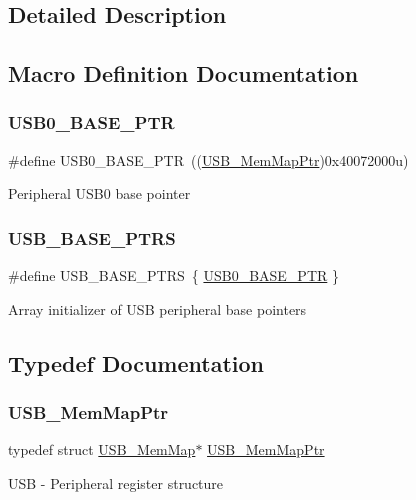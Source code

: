 \subsection{Detailed Description}


\subsection{Macro Definition Documentation}
\mbox{\label{group___u_s_b___peripheral_ga598ff5eb20a0551af232710b3f27640a}} 
\subsubsection{\texorpdfstring{U\+S\+B0\+\_\+\+B\+A\+S\+E\+\_\+\+P\+TR}{USB0\_BASE\_PTR}}
{\footnotesize\ttfamily \#define U\+S\+B0\+\_\+\+B\+A\+S\+E\+\_\+\+P\+TR~((\hyperlink{group___u_s_b___peripheral_gaabd989a49827dc34abb5de32732f4125}{U\+S\+B\+\_\+\+Mem\+Map\+Ptr})0x40072000u)}

Peripheral U\+S\+B0 base pointer \mbox{\label{group___u_s_b___peripheral_gabb481a231c7c57907377d7ee985f826c}} 
\subsubsection{\texorpdfstring{U\+S\+B\+\_\+\+B\+A\+S\+E\+\_\+\+P\+T\+RS}{USB\_BASE\_PTRS}}
{\footnotesize\ttfamily \#define U\+S\+B\+\_\+\+B\+A\+S\+E\+\_\+\+P\+T\+RS~\{ \hyperlink{group___u_s_b___peripheral_ga598ff5eb20a0551af232710b3f27640a}{U\+S\+B0\+\_\+\+B\+A\+S\+E\+\_\+\+P\+TR} \}}

Array initializer of U\+SB peripheral base pointers 

\subsection{Typedef Documentation}
\mbox{\label{group___u_s_b___peripheral_gaabd989a49827dc34abb5de32732f4125}} 
\subsubsection{\texorpdfstring{U\+S\+B\+\_\+\+Mem\+Map\+Ptr}{USB\_MemMapPtr}}
{\footnotesize\ttfamily typedef struct \hyperlink{struct_u_s_b___mem_map}{U\+S\+B\+\_\+\+Mem\+Map}$\ast$ \hyperlink{group___u_s_b___peripheral_gaabd989a49827dc34abb5de32732f4125}{U\+S\+B\+\_\+\+Mem\+Map\+Ptr}}

U\+SB -\/ Peripheral register structure 